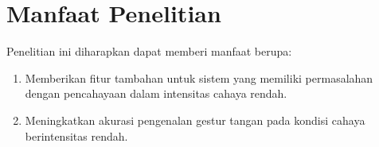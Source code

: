 \section{Manfaat Penelitian}
Penelitian ini diharapkan dapat memberi manfaat berupa:
\begin{enumerate}
\item Memberikan fitur tambahan untuk sistem yang memiliki permasalahan dengan pencahayaan dalam intensitas cahaya rendah.
\item Meningkatkan akurasi pengenalan gestur tangan pada kondisi cahaya berintensitas rendah.
\end{enumerate}

